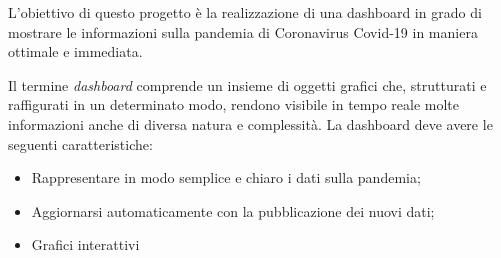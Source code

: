 
L’obiettivo di questo progetto è la realizzazione di una dashboard in grado di mostrare le informazioni sulla pandemia di Coronavirus Covid-19 in maniera ottimale e immediata.

Il termine \emph{dashboard} comprende un insieme di oggetti grafici che, strutturati e raffigurati in un determinato modo, rendono visibile in tempo reale molte informazioni anche di diversa natura e complessità. 
La dashboard deve avere le seguenti caratteristiche:

\begin{itemize}
    \item Rappresentare in modo semplice e chiaro i dati sulla pandemia;
    \item Aggiornarsi automaticamente con la pubblicazione dei nuovi dati;
    \item Grafici interattivi
\end{itemize}